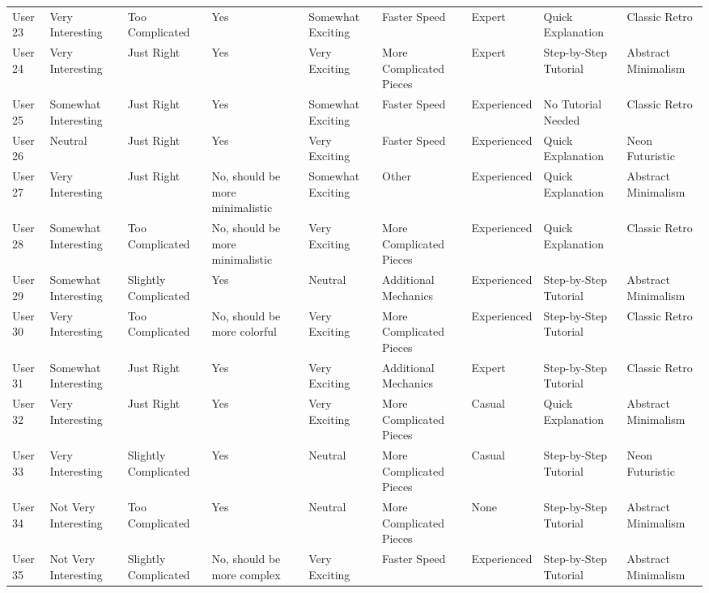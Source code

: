 \documentclass{article}
\begin{document}
\begin{landscape}
\begin{longtable}{lllllllll}
            User 23 & Very Interesting & Too Complicated & Yes & Somewhat Exciting & Faster Speed & Expert & Quick Explanation & Classic Retro \\
            User 24 & Very Interesting & Just Right & Yes & Very Exciting & More Complicated Pieces & Expert & Step-by-Step Tutorial & Abstract Minimalism \\
            User 25 & Somewhat Interesting & Just Right & Yes & Somewhat Exciting & Faster Speed & Experienced & No Tutorial Needed & Classic Retro \\
            User 26 & Neutral & Just Right & Yes & Very Exciting & Faster Speed & Experienced & Quick Explanation & Neon Futuristic \\
            User 27 & Very Interesting & Just Right & No, should be more minimalistic & Somewhat Exciting & Other & Experienced & Quick Explanation & Abstract Minimalism \\
            User 28 & Somewhat Interesting & Too Complicated & No, should be more minimalistic & Very Exciting & More Complicated Pieces & Experienced & Quick Explanation & Classic Retro \\
            User 29 & Somewhat Interesting & Slightly Complicated & Yes & Neutral & Additional Mechanics & Experienced & Step-by-Step Tutorial & Abstract Minimalism \\
            User 30 & Very Interesting & Too Complicated & No, should be more colorful & Very Exciting & More Complicated Pieces & Experienced & Step-by-Step Tutorial & Classic Retro \\
            User 31 & Somewhat Interesting & Just Right & Yes & Very Exciting & Additional Mechanics & Expert & Step-by-Step Tutorial & Classic Retro \\
            User 32 & Very Interesting & Just Right & Yes & Very Exciting & More Complicated Pieces & Casual & Quick Explanation & Abstract Minimalism \\
            User 33 & Very Interesting & Slightly Complicated & Yes & Neutral & More Complicated Pieces & Casual & Step-by-Step Tutorial & Neon Futuristic \\
            User 34 & Not Very Interesting & Too Complicated & Yes & Neutral & More Complicated Pieces & None & Step-by-Step Tutorial & Abstract Minimalism \\
            User 35 & Not Very Interesting & Slightly Complicated & No, should be more complex & Very Exciting & Faster Speed & Experienced & Step-by-Step Tutorial & Abstract Minimalism \\

\end{longtable}
\end{landscape}
\end{document}
